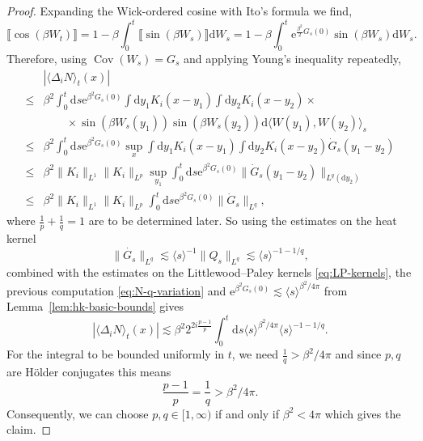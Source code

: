 \documentclass[11pt, a4paper]{scrartcl}
\numberwithin{equation}{section}
\theoremstyle{plain}
\theoremstyle{remark}
\newcommand{\mathd}{\mathrm{d}}
\newcommand{\mathe}{\mathrm{e}}
\newcommand{\tmop}[1]{\ensuremath{\operatorname{#1}}}
\begin{document}
\begin{proof}
  Expanding the Wick-ordered cosine with Ito's formula we find,
  \[ \llbracket \cos (\beta W_t) \rrbracket = 1 - \beta \int_0^t \llbracket
     \sin (\beta W_s) \rrbracket \mathd W_s = 1 - \beta \int_0^t
     \mathe^{\frac{\beta^2}{2} G_s (0)} \sin (\beta W_s) \mathd W_s . \]
  Therefore, using $\tmop{Cov} (W_s) = G_s$ and applying Young's inequality
  repeatedly,
  \begin{equation}
    \begin{aligned}
      & | \langle \Delta_i N \rangle_t (x) |\\
      \leqslant & \beta^2  \int^t_0 \mathd s \mathe^{\beta^2 G_s (0)}  \int
      \mathd y_1 K_i (x - y_1)  \int \mathd y_2 K_i (x - y_2) \times\\
      & \qquad \times \sin (\beta W_s (y_1)) \sin (\beta W_s (y_2)) \mathd
      \langle W (y_1), W (y_2) \rangle_s\\
      \leqslant & \beta^2 \int_0^t \mathd s \mathe^{\beta^2 G_s (0)} \sup_x 
      \int \mathd y_1 K_i (x - y_1)  \int \mathd y_2 K_i (x - y_2)  \dot{G}_s
      (y_1 - y_2)\\
      \leqslant & \beta^2 \| K_i \|_{L^1} \| K_i \|_{L^p} \sup_{y_1}  \int_0^t
      \mathd s \mathe^{\beta^2 G_s (0)} \| \dot{G}_s (y_1 - y_2) \|_{L^q
      (\mathd y_2)}\\
      \leqslant & \beta^2 \| K_i \|_{L^1} \| K_i \|_{L^p}  \int_0^t \mathd s
      \mathe^{\beta^2 G_s (0)} \| \dot{G}_s \|_{L^q},
    \end{aligned} \label{eq:N-q-variation}
  \end{equation}
  where $\frac{1}{p} + \frac{1}{q} = 1$ are to be determined later. So using
  the estimates on the heat kernel
  \[ \| \dot{G_s} \|_{L^q} \lesssim \langle s \rangle^{- 1} \| Q_s \|_{L^q}
     \lesssim \langle s \rangle^{- 1 - 1 / q}, \]
  combined with the estimates on the Littlewood--Paley kernels
  \eqref{eq:LP-kernels}, the previous computation \eqref{eq:N-q-variation} and
  $\mathe^{\beta^2 G_s (0)} \lesssim \langle s \rangle^{\beta^2 / 4 \pi}$ from
  Lemma~\ref{lem:hk-basic-bounds} gives
  \[ | \langle \Delta_i N \rangle_t (x) | \lesssim \beta^2 2^{2 i \frac{p -
     1}{p}}  \int_0^t \mathd s \langle s \rangle^{\beta^2 / 4 \pi}  \langle s
     \rangle^{- 1 - 1 / q} . \]
  For the integral to be bounded uniformly in $t$, we need $\frac{1}{q} >
  \beta^2 / 4 \pi$ and since $p, q$ are H{\"o}lder conjugates this means
  \[ \frac{p - 1}{p} = \frac{1}{q} > \beta^2 / 4 \pi . \]
  Consequently, we can choose $p, q \in [1, \infty)$ if and only if $\beta^2 <
  4 \pi$ which gives the claim.
\end{proof}
\end{document}
